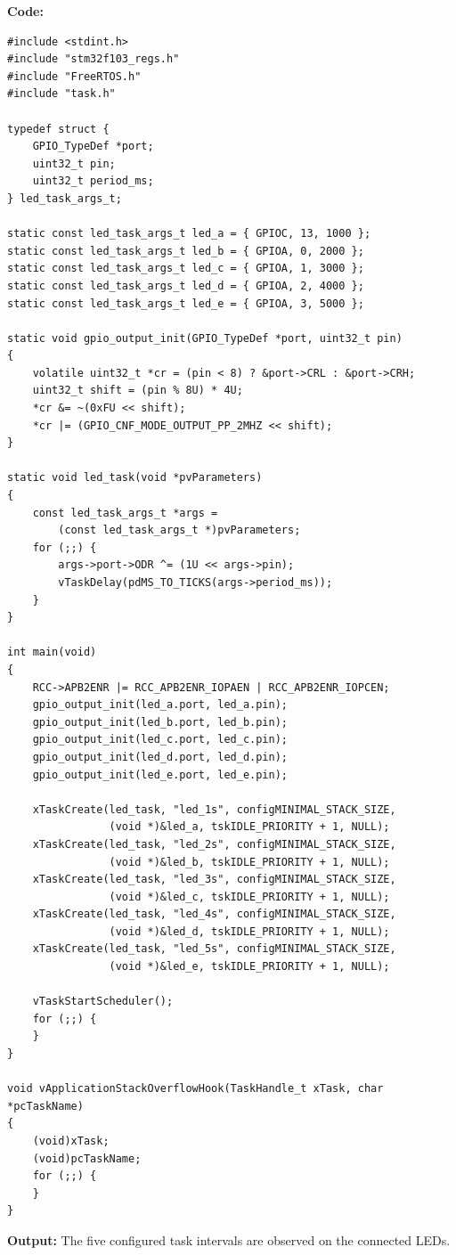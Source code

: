 \documentclass[12pt,a4paper]{article}
\begin{document}
\textbf{Code:}
\begin{lstlisting}
#include <stdint.h>
#include "stm32f103_regs.h"
#include "FreeRTOS.h"
#include "task.h"

typedef struct {
    GPIO_TypeDef *port;
    uint32_t pin;
    uint32_t period_ms;
} led_task_args_t;

static const led_task_args_t led_a = { GPIOC, 13, 1000 };
static const led_task_args_t led_b = { GPIOA, 0, 2000 };
static const led_task_args_t led_c = { GPIOA, 1, 3000 };
static const led_task_args_t led_d = { GPIOA, 2, 4000 };
static const led_task_args_t led_e = { GPIOA, 3, 5000 };

static void gpio_output_init(GPIO_TypeDef *port, uint32_t pin)
{
    volatile uint32_t *cr = (pin < 8) ? &port->CRL : &port->CRH;
    uint32_t shift = (pin % 8U) * 4U;
    *cr &= ~(0xFU << shift);
    *cr |= (GPIO_CNF_MODE_OUTPUT_PP_2MHZ << shift);
}

static void led_task(void *pvParameters)
{
    const led_task_args_t *args =
        (const led_task_args_t *)pvParameters;
    for (;;) {
        args->port->ODR ^= (1U << args->pin);
        vTaskDelay(pdMS_TO_TICKS(args->period_ms));
    }
}

int main(void)
{
    RCC->APB2ENR |= RCC_APB2ENR_IOPAEN | RCC_APB2ENR_IOPCEN;
    gpio_output_init(led_a.port, led_a.pin);
    gpio_output_init(led_b.port, led_b.pin);
    gpio_output_init(led_c.port, led_c.pin);
    gpio_output_init(led_d.port, led_d.pin);
    gpio_output_init(led_e.port, led_e.pin);

    xTaskCreate(led_task, "led_1s", configMINIMAL_STACK_SIZE,
                (void *)&led_a, tskIDLE_PRIORITY + 1, NULL);
    xTaskCreate(led_task, "led_2s", configMINIMAL_STACK_SIZE,
                (void *)&led_b, tskIDLE_PRIORITY + 1, NULL);
    xTaskCreate(led_task, "led_3s", configMINIMAL_STACK_SIZE,
                (void *)&led_c, tskIDLE_PRIORITY + 1, NULL);
    xTaskCreate(led_task, "led_4s", configMINIMAL_STACK_SIZE,
                (void *)&led_d, tskIDLE_PRIORITY + 1, NULL);
    xTaskCreate(led_task, "led_5s", configMINIMAL_STACK_SIZE,
                (void *)&led_e, tskIDLE_PRIORITY + 1, NULL);

    vTaskStartScheduler();
    for (;;) {
    }
}

void vApplicationStackOverflowHook(TaskHandle_t xTask, char *pcTaskName)
{
    (void)xTask;
    (void)pcTaskName;
    for (;;) {
    }
}
\end{lstlisting}

\textbf{Output:} The five configured task intervals are observed on the
connected LEDs.
\end{document}
